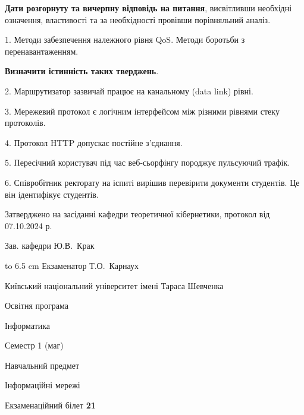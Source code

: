 \documentclass[12pt, ukrainian]{article}
\begin{document}
{
\qquad\textbf{Дати розгорнуту та вичерпну відповідь на питання}, висвітливши необхідні означення, властивості та за необхідності провівши порівняльний аналіз.

1. Методи забезпечення належного рівня QoS. Методи боротьби з перенавантаженням.



\qquad\textbf{Визначити істинність таких тверджень}.

2. Маршрутизатор зазвичай працює на канальному (data link) рівні.


3. Мережевий протокол є логічним інтерфейсом між різними рівнями стеку протоколів.


4. Протокол  HTTP допускає постійне з'єднання.


5. Пересічний користувач під час веб-сьорфінгу породжує пульсуючий трафік.


6. Співробітник ректорату на іспиті вирішив перевірити документи студентів. Це він ідентифікує студентів.

}
{\smallskip\smallskip \begin {scriptsize} Затверджено на засіданні кафедри теоретичної кібернетики, протокол   від   07.10.2024 р.\par\smallskip\smallskip\smallskip\smallskip
{\parbox {6.5 cm} {Зав. кафедри \dotfill Ю.В.~Крак}}\hspace {0.7cm} {\hbox to 6.5 cm { Екзаменатор \dotfill Т.О.~Карнаух}} \end{scriptsize}}
\vspace{0.9cm}
{{\begin {scriptsize}\par
{ \center  Київський національний університет імені Тараса Шевченка \par}
{\parbox {5 cm}{Освітня програма \hfill}{\parbox {7 cm}{Інформатика\hfill}}\parbox {6 cm}{\hfill Семестр 1 (маг)}}\par
{\parbox {5 cm} {Навчальний предмет \hfill}\parbox {7 cm}{Інформаційні мережі \hfill}\parbox {6cm}{\hfill}\par}\vspace{-15pt} \end{scriptsize}}{\center Екзаменаційний білет \No \textbf { 21 }\par}}
\end{document}
